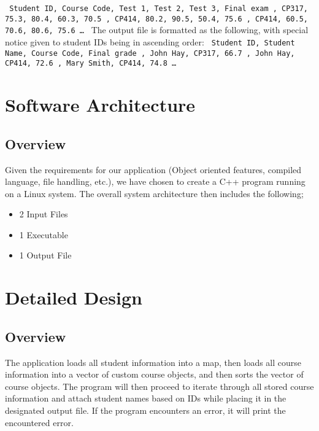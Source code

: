 \documentclass{article}
\begin{document}
\texttt{  \newline
  Student ID, Course Code, Test 1, Test 2, Test 3, Final exam , CP317, 75.3, 80.4, 60.3, 70.5 , CP414, 80.2, 90.5, 50.4, 75.6 , CP414, 60.5, 70.6, 80.6, 75.6 \newline
  \ldots
}
\newline \newline
The output file is formatted as the following, with special notice given to student IDs being in ascending order:
\texttt{  \newline
  Student ID, Student Name, Course Code, Final grade , John Hay, CP317, 66.7 , John Hay, CP414, 72.6 , Mary Smith, CP414, 74.8 \newline
  \ldots
}

\section{Software Architecture}
\subsection{Overview}
Given the requirements for our application (Object oriented features, compiled language, file handling, etc.), we have chosen to create a C++ program running on a Linux system.
The overall system architecture then includes the following; 
\begin{itemize}
\item 2 Input Files
\item 1 Executable
\item 1 Output File
\end{itemize}

\section{Detailed Design}
\subsection{Overview}
The application loads all student information into a map, then loads all course information into a vector of custom course objects, and then sorts the vector of course objects. The program will then proceed to iterate through all stored course information and attach student names based on IDs while placing it in the designated output file. If the program encounters an error, it will print the encountered error.
\end{document}
